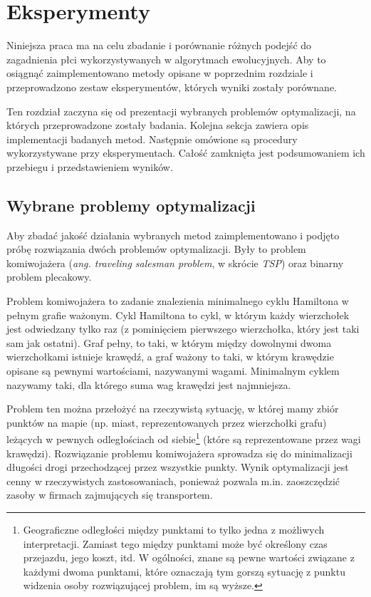 \documentclass[./FM_mgr.tex]{subfiles}
\begin{document}
\chapter{Eksperymenty} \label{chapter:experiments}

Niniejsza praca ma na celu zbadanie i porównanie różnych podejść do zagadnienia płci wykorzystywanych w algorytmach ewolucyjnych.
Aby to osiągnąć zaimplementowano metody opisane w poprzednim rozdziale i przeprowadzono zestaw eksperymentów, których wyniki zostały porównane.

Ten rozdział zaczyna się od prezentacji wybranych problemów optymalizacji, na których przeprowadzone zostały badania. Kolejna sekcja zawiera opis implementacji badanych metod. Następnie omówione są procedury wykorzystywane przy eksperymentach. Całość zamknięta jest podsumowaniem ich przebiegu i przedstawieniem wyników.

\section{Wybrane problemy optymalizacji}


Aby zbadać jakość działania wybranych metod zaimplementowano i podjęto próbę rozwiązania dwóch problemów optymalizacji. 
Były to problem komiwojażera (\emph{ang. traveling salesman problem}, w skrócie \emph{TSP}) oraz binarny problem plecakowy.

Problem komiwojażera to zadanie znalezienia minimalnego cyklu Hamiltona w pełnym grafie ważonym. 
Cykl Hamiltona to cykl, w którym każdy wierzchołek jest odwiedzany tylko raz (z pominięciem pierwszego wierzchołka, który jest taki sam jak ostatni). 
Graf pełny, to taki, w którym między dowolnymi dwoma wierzchołkami istnieje krawędź, a graf ważony to taki, w którym krawędzie opisane są pewnymi wartościami, nazywanymi wagami. 
Minimalnym cyklem nazywamy taki, dla którego suma wag krawędzi jest najmniejsza.

Problem ten można przełożyć na rzeczywistą sytuację, w której mamy zbiór punktów na mapie (np. miast, reprezentowanych przez wierzchołki grafu) leżących w pewnych odległościach od siebie\footnote{
	Geograficzne odległości między punktami to tylko jedna z możliwych interpretacji.
	Zamiast tego między punktami może być określony czas przejazdu, jego koszt, itd.
	W ogólności, znane są pewne wartości związane z każdymi dwoma punktami, które oznaczają tym gorszą sytuację z punktu widzenia osoby rozwiązującej problem, im są wyższe.
} (które są reprezentowane przez wagi krawędzi). 
Rozwiązanie problemu komiwojażera sprowadza się do minimalizacji długości drogi przechodzącej przez wszystkie punkty. 
Wynik optymalizacji jest cenny w rzeczywistych zastosowaniach, ponieważ pozwala m.in. zaoszczędzić zasoby w firmach zajmujących się transportem.
\end{document}
